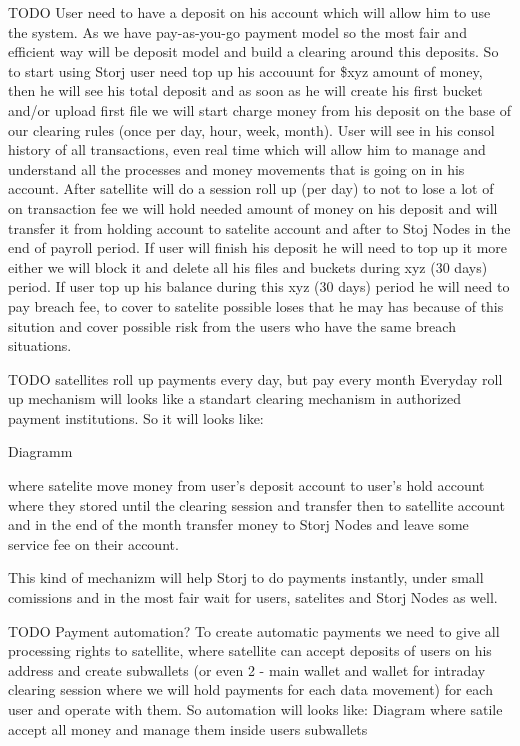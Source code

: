 \documentclass[11pt,fleqn,openany]{book}
\newcommand{\todo}[1]{{\color{red} TODO #1 }}
\begin{document}
\todo{
User need to have a deposit on his account which will allow him to use the system. As we have pay-as-you-go payment model so the most fair and efficient way will be deposit model and build a clearing  around this deposits.
So to start using Storj user need top up his accouunt for \$xyz amount of money, then he will see his total deposit and as soon as he will create his first bucket and/or upload first file we will start charge money from his deposit on the base of our clearing rules (once per day, hour, week, month). User will see in his consol history of all transactions, even real time which will allow him to manage and understand all the processes and money movements that is going on in his account.
After satellite will do a session roll up  (per day) to not to lose a lot of on transaction fee we will hold needed amount of money on his deposit and will transfer it from holding account to satelite account and after to Stoj Nodes in the end of payroll period.
If user will finish his deposit he will need to top up it more either we will block it and delete all his files and buckets during xyz (30 days) period. If user top up his balance during this xyz (30 days) period he will need to pay breach fee, to cover to satelite possible loses that he may has because of this sitution and cover possible risk from the users who have the same breach situations.

TODO satellites roll up payments every day, but pay every month
Everyday roll up mechanism will looks like a standart clearing mechanism in authorized payment institutions. So it will looks like:

Diagramm

where satelite move money from user’s deposit account to user’s hold account where they stored until the clearing session and transfer then to satellite account and in the end of the month transfer money to Storj Nodes and leave some service fee on their account.

This kind of mechanizm will help Storj to do payments instantly, under small comissions and in the most fair wait for users, satelites and Storj Nodes as well.


TODO Payment automation?
To create automatic payments we need to give all processing rights to satellite, where satellite can accept deposits of users on his address and create subwallets (or even 2 - main wallet and wallet for intraday clearing session where we will hold payments for each data movement) for each user and operate with them.
So automation will looks like:
Diagram where satile accept all money and manage them inside users subwallets
}
\end{document}

